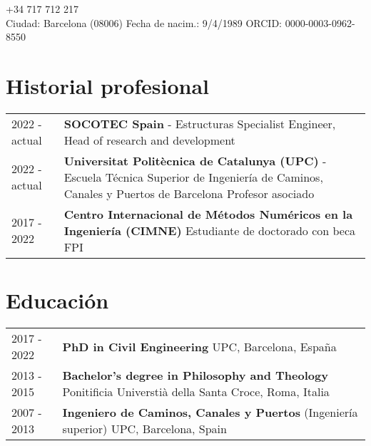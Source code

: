 \documentclass[12pt]{article}
\author{Dr. Ing. Miguel Masó}
\begin{document}
\maketitle
{} \qquad +34 717 712 217 \\
Ciudad: Barcelona (08006) \qquad
Fecha de nacim.: 9/4/1989 \qquad
ORCID: 0000-0003-0962-8550


\section{Historial profesional}
\begin{tabularx}{\linewidth}{lX}
    2022 - actual &
    \textbf{SOCOTEC Spain} - Estructuras \newline
    Specialist Engineer, Head of research and development \\

    2022 - actual &
    \textbf{Universitat Politècnica de Catalunya (UPC)} - Escuela Técnica Superior de Ingeniería de Caminos, Canales y Puertos de Barcelona \newline
    Profesor asociado \\ 

    2017 - 2022 &
    \textbf{Centro Internacional de Métodos Numéricos en la Ingeniería (CIMNE)} \newline
    Estudiante de doctorado con beca FPI \\
\end{tabularx}


\section{Educación}
\begin{tabularx}{\linewidth}{lX}
    2017 - 2022 &
    \textbf{PhD in Civil Engineering} \newline
    UPC, Barcelona, España \\

    2013 - 2015 &
    \textbf{Bachelor's degree in Philosophy and Theology} \newline
    Ponitificia Universtià della Santa Croce, Roma, Italia \\

    2007 - 2013 &
    \textbf{Ingeniero de Caminos, Canales y Puertos} (Ingeniería superior) \newline
    UPC, Barcelona, Spain \\
\end{tabularx}
\end{document}
